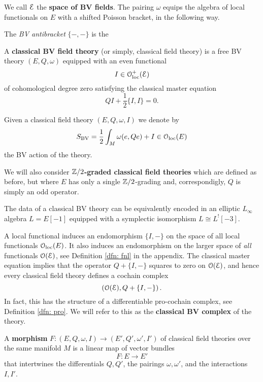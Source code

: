 \documentclass[10pt, oneside]{article}
\begin{document}
We call $\mathcal E$ the {\bf space of BV fields}.  The pairing $\omega$ equips the algebra of local functionals on $E$ with a shifted Poisson bracket, in the following way.
\begin{definition}
The \emph{BV antibracket} $\{-,-\}$ is the 
\end{definition}

\begin{definition}
A {\bf classical BV field theory} (or simply, classical field theory) is a free BV theory $(E, Q, \omega)$ equipped with an even functional
\[I \in \mathcal{O}_{\rm loc}^+(\mathcal E)\]
of cohomological degree zero satisfying the classical master equation 
\[Q I + \frac{1}{2} \{I,I\} = 0 .\]
\end{definition}

Given a classical field theory $(E, Q, \omega, I)$ we denote by
\[S_{\mathrm{BV}} = \frac{1}{2} \int_M \omega(e, Q e) + I\in \mathcal{O}_{\rm loc}(E)\]
the BV action of the theory.

\begin{remark}
We will also consider {\bf $\mathbb Z/2$-graded classical field theories} which are defined as before, but where $E$ has only a single $\mathbb Z/2$-grading and, correspondigly, $Q$ is simply an odd operator.
\end{remark}

\begin{remark}
The data of a classical BV theory can be equivalently encoded in an elliptic $L_\infty$ algebra $L=E[-1]$ equipped with a symplectic isomorphism $L\cong L^![-3]$.
\end{remark}

A local functional induces an endomorphism $\{I,-\}$ on the space of all local functionals $\mathcal{O}_{\rm loc}(E)$. 
It also induces an endomorphism on the larger space of {\em all} functionals $\mathcal O(\mathcal E)$, see Definition \ref{dfn: fnl} in the appendix. 
The classical master equation implies that the operator $Q + \{I,-\}$ squares to zero on $\mathcal O(\mathcal E)$, and hence every classical field theory defines a cochain complex
\begin{equation}\label{bvcplx}
\left(\mathcal O(\mathcal E), Q + \{I,-\}\right) .
\end{equation}
In fact, this has the structure of a differentiable pro-cochain complex, see Definition \ref{dfn: pro}. 
We will refer to this as the {\bf classical BV complex} of the theory. 

\begin{definition}
A {\bf morphism} $F\colon (E, Q, \omega, I) \to (E', Q', \omega', I')$ of classical field theories over the same manifold $M$ is a linear map of vector bundles
\[
F\colon E \to E'
\]
that intertwines the differentials $Q, Q'$, the pairings $\omega, \omega'$, and the interactions $I,I'$. 
\end{definition}
\end{document}
